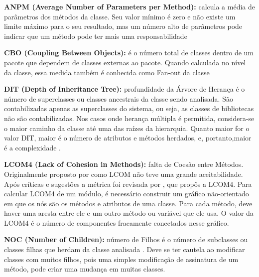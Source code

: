  \vspace{\onelineskip} 

 \textbf{ANPM (Average Number of Parameters per Method):}  calcula a média de parâmetros dos métodos da classe. Seu valor mínimo é zero e não existe um limite máximo para o seu resultado, mas um número alto de parâmetros pode indicar que um método pode ter mais uma responsabilidade \cite{Basili1987}


 \vspace{\onelineskip} 

\textbf{CBO (Coupling Between Objects):}   é o número total de classes dentro de um pacote que dependem de classes externas ao pacote. Quando calculada no nível da classe, essa medida também é conhecida como Fan-out da classe \cite{Chidamber94}

 \vspace{\onelineskip} 

\textbf{DIT (Depth of Inheritance Tree):} profundidade da Árvore de Herança é o número
de superclasses ou classes ancestrais da classe sendo analisada. São contabilizadas
apenas as superclasses do sistema, ou seja, as classes de bibliotecas não são
contabilizadas. Nos casos onde herança múltipla é permitida, considera-se o maior
caminho da classe até uma das raízes da hierarquia. Quanto maior for o valor DIT,
maior é o número de atributos e métodos herdados, e, portanto,maior é a complexidade
\cite{Shih97}.

 \vspace{\onelineskip} 

\textbf{LCOM4 (Lack of Cohesion in Methods):} falta de Coesão entre Métodos. Originalmente
proposto por  como LCOM não teve uma
grande aceitabilidade. Após críticas e sugestões a métrica foi revisada por , que propôs a LCOM4. Para calcular LCOM4 de um módulo, é
necessário construir um gráfico não-orientado em que os nós são os métodos e atributos
de uma classe. Para cada método, deve haver uma aresta entre ele e um outro
método ou variável que ele usa. O valor da LCOM4 é o número de componentes
fracamente conectados nesse gráfico.


 \vspace{\onelineskip} 

\textbf{NOC (Number of Children):} número de Filhos é o número de subclasses ou classes
filhas que herdam da classe analisada \cite{Rosenberg97}. Deve se ter
cautela ao modificar classes com muitos filhos, pois uma simples modificação de
assinatura de um método, pode criar uma mudança em muitas classes.


